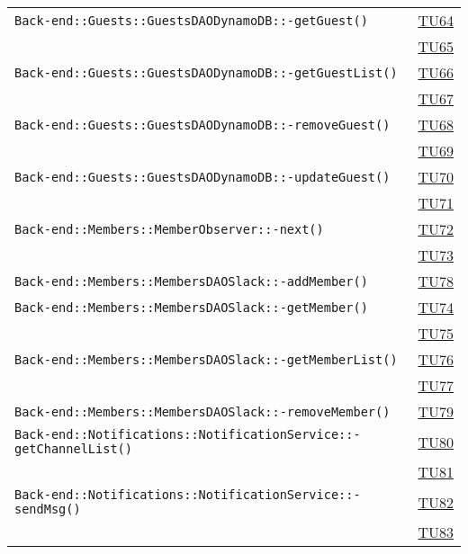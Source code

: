 \begin{longtable}{|>{\centering}m{12cm}|m{1cm}<{\centering}|}
\texttt{Back-end::Guests::GuestsDAODynamoDB::-\linebreak getGuest()} & \hyperlink{TU64}{TU64}\\ & \hyperlink{TU65}{TU65}\\ \hline
\texttt{Back-end::Guests::GuestsDAODynamoDB::-\linebreak getGuestList()} & \hyperlink{TU66}{TU66}\\ & \hyperlink{TU67}{TU67}\\ \hline
\texttt{Back-end::Guests::GuestsDAODynamoDB::-\linebreak removeGuest()} & \hyperlink{TU68}{TU68}\\ & \hyperlink{TU69}{TU69}\\ \hline
\texttt{Back-end::Guests::GuestsDAODynamoDB::-\linebreak updateGuest()} & \hyperlink{TU70}{TU70}\\ & \hyperlink{TU71}{TU71}\\ \hline
\texttt{Back-end::Members::MemberObserver::-\linebreak next()} & \hyperlink{TU72}{TU72}\\ & \hyperlink{TU73}{TU73}\\ \hline
\texttt{Back-end::Members::MembersDAOSlack::-\linebreak addMember()} & \hyperlink{TU78}{TU78}\\ \hline
\texttt{Back-end::Members::MembersDAOSlack::-\linebreak getMember()} & \hyperlink{TU74}{TU74}\\ & \hyperlink{TU75}{TU75}\\ \hline
\texttt{Back-end::Members::MembersDAOSlack::-\linebreak getMemberList()} & \hyperlink{TU76}{TU76}\\ & \hyperlink{TU77}{TU77}\\ \hline
\texttt{Back-end::Members::MembersDAOSlack::-\linebreak removeMember()} & \hyperlink{TU79}{TU79}\\ \hline
\texttt{Back-end::Notifications::NotificationService::-\linebreak getChannelList()} & \hyperlink{TU80}{TU80}\\ & \hyperlink{TU81}{TU81}\\ \hline
\texttt{Back-end::Notifications::NotificationService::-\linebreak sendMsg()} & \hyperlink{TU82}{TU82}\\ & \hyperlink{TU83}{TU83}\\ \hline

\end{longtable}
